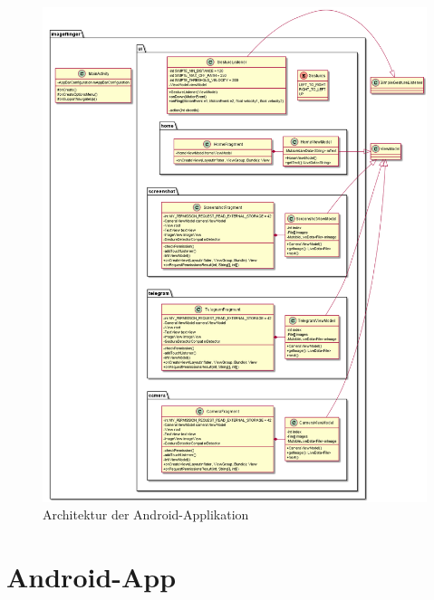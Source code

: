 \begin{figure}[H]
    \centering
    \includegraphics[width=1\linewidth]{figures/classdiagram.png}
    \caption{Architektur der Android-Applikation}
    \label{fig:Architektur}
\end{figure}

\section{Android-App}

